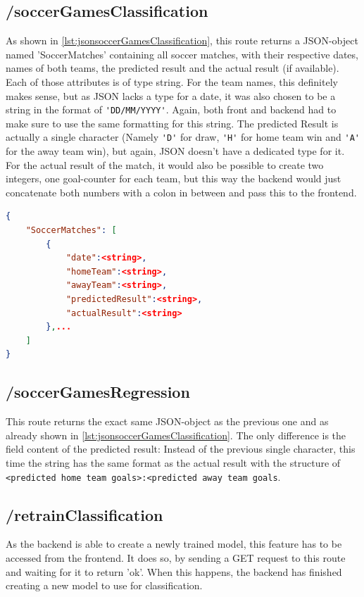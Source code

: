 \subsection{/soccerGamesClassification}
As shown in \ref{lst:jsonsoccerGamesClassification}, this route returns a JSON-object named 'SoccerMatches' containing all soccer matches, with their respective dates, names of both teams, the predicted result and the actual result (if available). Each of those attributes is of type string. For the team names, this definitely makes sense, but as JSON lacks a type for a date, it was also chosen to be a string in the format of \lstinline[columns=fixed]{'DD/MM/YYYY'}. Again, both front and backend had to make sure to use the same formatting for this string. The predicted Result is actually a single character (Namely \lstinline[columns=fixed]{'D'} for draw, \lstinline[columns=fixed]{'H'} for home team win and \lstinline[columns=fixed]{'A'} for the away team win), but again, JSON doesn't have a dedicated type for it. For the actual result of the match, it would also be possible to create two integers, one goal-counter for each team, but this way the backend would just concatenate both numbers with a colon in between and pass this to the frontend.

\begin{lstlisting}[language=JSON,label={lst:jsonsoccerGamesClassification}, caption=JSON structure of API call on /soccerGamesClassification]
{
    "SoccerMatches": [
        {
            "date":<string>,
            "homeTeam":<string>,
            "awayTeam":<string>,
            "predictedResult":<string>,
            "actualResult":<string>
        },...
    ]
}
\end{lstlisting}

\subsection{/soccerGamesRegression}
This route returns the exact same JSON-object as the previous one and as already shown in \ref{lst:jsonsoccerGamesClassification}. The only difference is the field content of the predicted result: Instead of the previous single character, this time the string has the same format as the actual result with the structure of \lstinline[columns=fixed]{<predicted home team goals>:<predicted away team goals}.

\subsection{/retrainClassification}
As the backend is able to create a newly trained model, this feature has to be accessed from the frontend. It does so, by sending a GET request to this route and waiting for it to return 'ok'. When this happens, the backend has finished creating a new model to use for classification.

